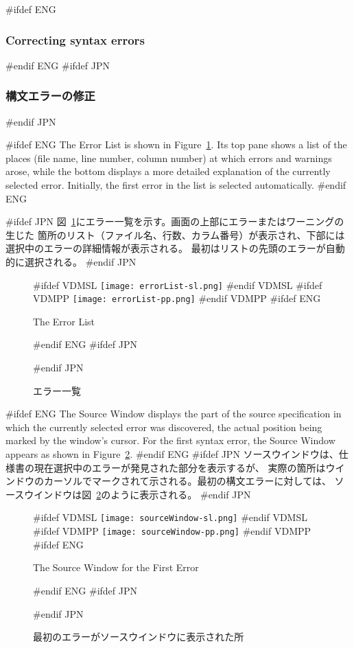 \documentclass[\pformat,12pt]{article}
\newcommand{\guicmd}[1]{{\sf #1}}
\newcommand{\guicmd}[1]{{\gt #1}}
\begin{document}
#ifdef ENG
\subsubsection{Correcting syntax errors}
#endif ENG
#ifdef JPN
\subsubsection{構文エラーの修正}
#endif JPN

#ifdef ENG
The \guicmd{Error List} is shown in Figure~\ref{fig:error}. Its top
pane shows a list of the places (file name, line number, column
number) at which errors and warnings arose, while the bottom
displays a more detailed explanation of the currently selected
error. Initially, the first error in the list is selected
automatically.
#endif ENG

#ifdef JPN
図~\ref{fig:error}に\guicmd{エラー一覧}を示す。画面の上部にエラーまたはワーニングの生じた
箇所のリスト（ファイル名、行数、カラム番号）が表示され、下部には選択中のエラーの詳細情報が表示される。
最初はリストの先頭のエラーが自動的に選択される。
#endif JPN

\begin{figure}[tbh]
\begin{center}
#ifdef VDMSL
\texttt{[image: errorList-sl.png]}
#endif VDMSL
#ifdef VDMPP
\texttt{[image: errorList-pp.png]}
#endif VDMPP
#ifdef ENG
\caption{The Error List}
#endif ENG
#ifdef JPN
\caption{エラー一覧}
#endif JPN
\label{fig:error}
\end{center}
\end{figure}

#ifdef ENG
The \guicmd{Source Window} displays the part of the source
specification in which the currently selected error was discovered,
the actual position being marked by the window's cursor. For the first
syntax error, the \guicmd{Source Window} appears as shown in
Figure~\ref{fig:source1}.
#endif ENG
#ifdef JPN
\guicmd{ソースウインドウ}は、仕様書の現在選択中のエラーが発見された部分を表示するが、
実際の箇所はウインドウのカーソルでマークされて示される。最初の構文エラーに対しては、
\guicmd{ソースウインドウ}は図~\ref{fig:source1}のように表示される。
#endif JPN

\begin{figure}[tbh]
\begin{center}
#ifdef VDMSL
\texttt{[image: sourceWindow-sl.png]}
#endif VDMSL
#ifdef VDMPP
\texttt{[image: sourceWindow-pp.png]}
#endif VDMPP
#ifdef ENG
\caption{The Source Window for the First Error}
#endif ENG
#ifdef JPN
\caption{最初のエラーがソースウインドウに表示された所}
#endif JPN
\label{fig:source1}
\end{center}
\end{figure}
\end{document}
